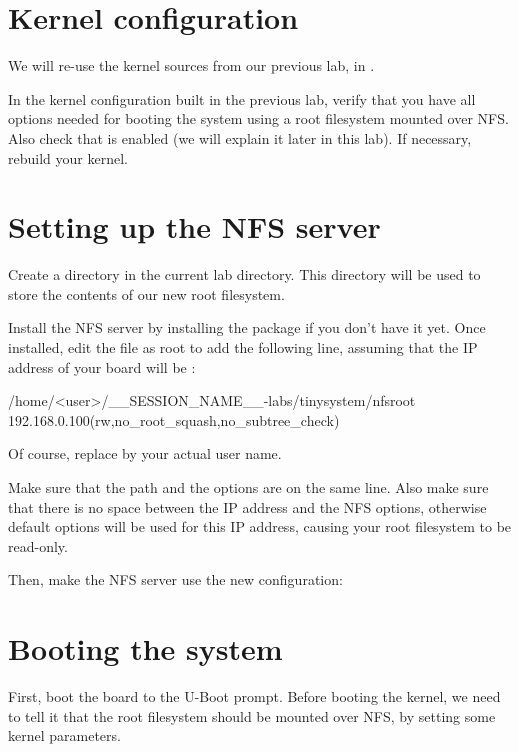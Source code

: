 \section{Kernel configuration}

We will re-use the kernel sources from our previous lab, in
.

In the kernel configuration built in the previous lab, verify that you
have all options needed for booting the system using a root filesystem
mounted over NFS. Also check that  is
enabled (we will explain it later in this lab). If necessary, rebuild
your kernel.

\section{Setting up the NFS server}

Create a  directory in the current lab directory. This
 directory will be used to store the contents of our new
root filesystem.

Install the NFS server by installing the 
package if you don't have it yet. Once installed, edit the
 file as root to add the following line, assuming that the
IP address of your board will be :

\begin{fileinput}
/home/<user>/__SESSION_NAME__-labs/tinysystem/nfsroot 192.168.0.100(rw,no_root_squash,no_subtree_check)
\end{fileinput}

Of course, replace  by your actual user name.

Make sure that the path and the options are on the same line.
Also make sure that there is no space between the IP address and the NFS
options, otherwise default options will be used for this IP address,
causing your root filesystem to be read-only.

Then, make the NFS server use the new configuration:


\section{Booting the system}

First, boot the board to the U-Boot prompt. Before booting the kernel,
we need to tell it that the root filesystem should be mounted over
NFS, by setting some kernel parameters.


